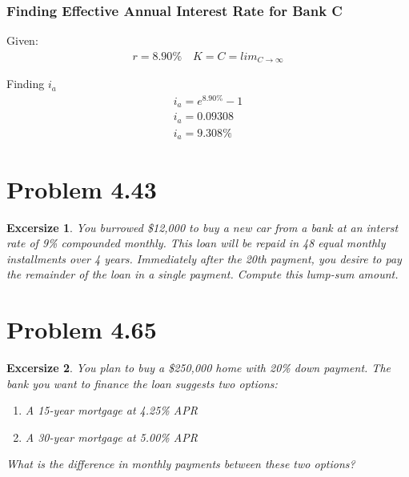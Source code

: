 \documentclass{report} %
\newtheorem{exrc}{Excersize}
\begin{document}
\subsubsection*{Finding Effective Annual Interest Rate for Bank C}
Given:
\begin{equation*}
    \begin{aligned}
        r = 8.90\% \quad K = C = lim_{C \rightarrow \infty} 
    \end{aligned}
\end{equation*}

\noindent
Finding $i_a$
\begin{equation*}
    \begin{aligned}
        i_a = e^{8.90\%} - 1 \\
        i_a = 0.09308 \\
        i_a = 9.308\%
    \end{aligned}
\end{equation*}

\section*{Problem 4.43}
\begin{exrc}
    You burrowed \$12,000 to buy a new car from a bank at an interst rate of 9\% compounded monthly. This loan will be repaid in 48 equal monthly installments over 4 years. Immediately after the 20th payment, you desire to pay the remainder of the loan in a single payment. Compute this lump-sum amount.
\end{exrc}

\section*{Problem 4.65}
\begin{exrc}
    You plan to buy a \$250,000 home with 20\% down payment. The bank you want to finance the loan suggests two options:
    \begin{enumerate}
        \item A 15-year mortgage at 4.25\% APR
        \item A 30-year mortgage at 5.00\% APR
    \end{enumerate}
    What is the difference in monthly payments between these two options?
\end{exrc}
\end{document}
